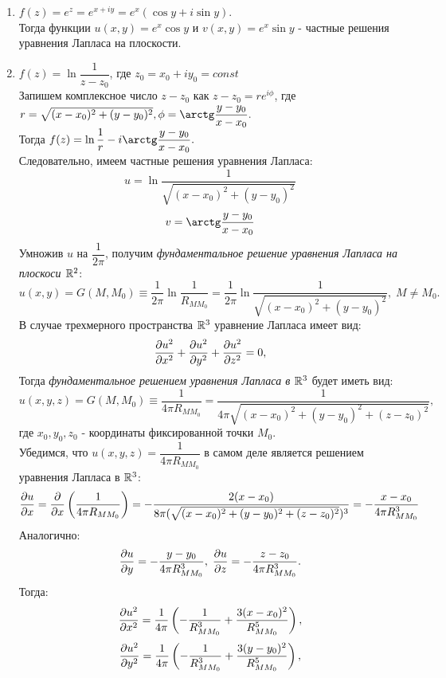 \documentclass[../main.tex]{subfiles}
\begin{document}
    \begin{enumerate}
        \item $f(z) = e^z = e^{x+iy} = e^x(\cos{y}+i\sin{y})$.\\ Тогда функции $u(x,y) = e^x\cos{y}$ и $v(x,y) = e^x\sin{y}$ - частные решения уравнения Лапласа на плоскости.
        \item $f(z) = \ln{\dfrac{1}{z-z_0}}$, где $z_0 = x_0 + iy_0 = const$\\
        Запишем комплексное число $z-z_0$ как $z-z_0=re^{i\phi}$, где $r = \sqrt{(x-x_0)^2 + (y - y_0)^2},\\\phi = \arctg\dfrac{y-y_0}{x-x_0}.$\\
        Тогда $f(z) = \ln{\dfrac{1}{r}} - i\arctg\dfrac{y-y_0}{x-x_0}.$\\
        Следовательно, имеем частные решения уравнения Лапласа:
        \[
            u = \ln{\dfrac{1}{\sqrt{(x-x_0)^2 + (y - y_0)^2}}}
        \]
        \[
            v = \arctg\dfrac{y-y_0}{x-x_0}
        \]
        Умножив $u$ на $\dfrac{1}{2\pi}$, получим \textit{фундаментальное решение уравнения Лапласа на плоскоси $\mathbb{R}^2$}:
        \[
            u(x, y) = G(M, M_0) \equiv \dfrac{1}{2\pi}\ln{\dfrac{1}{R_{MM_0}}} =  \dfrac{1}{2\pi}\ln{\dfrac{1}{\sqrt{(x-x_0)^2 + (y - y_0)^2}}},\; M \ne M_0.
        \]
        В случае трехмерного пространства $\mathbb{R}^3$ уравнение Лапласа имеет вид:
        \[
            \pderivTwo{u}{x}{x} + \pderivTwo{u}{y}{y} + \pderivTwo{u}{z}{z} = 0,
        \]
        Тогда \textit{фундаментальное решением уравнения Лапласа в $\mathbb{R}^3$} будет иметь вид:
        \[
            u(x, y, z) = G(M, M_0) \equiv \dfrac{1}{4\pi R_{MM_0}} =  \dfrac{1}{4\pi{\sqrt{(x-x_0)^2 + (y - y_0)^2 + (z - z_0)^2}}},
        \]
        где $x_0, y_0, z_0$ - координаты фиксированной точки $M_0$.\\
        Убедимся, что $u(x, y, z) = \dfrac{1}{4\pi R_{MM_0}}$ в самом деле является решением уравнения Лапласа в $\mathbb{R}^3$:
        \[
            \frac{\partial u}{\partial x} = \frac{\partial}{\partial x}\left(\dfrac{1}{4\pi R_{MM_0}}\right) =  - \dfrac{2(x-x_0)}{{8\pi(\sqrt{(x-x_0)^2 + (y - y_0)^2 + (z - z_0)^2}})^3} = - \dfrac{x-x_0}{4\pi R_{MM_0}^3}
        \]
        Аналогично:
        \[
            \frac{\partial u}{\partial y} = - \dfrac{y-y_0}{4\pi R_{MM_0}^3},\;
            \frac{\partial u}{\partial z} = - \dfrac{z-z_0}{4\pi R_{MM_0}^3}.
        \]
        Тогда:
        \[
            \pderivTwo{u}{x}{x} = \dfrac{1}{4\pi} \left(-\dfrac{1}{R_{MM_0}^3} + \dfrac{3(x-x_0)^2}{R_{MM_0}^5}\right),
        \]
        \[
            \pderivTwo{u}{y}{y} = \dfrac{1}{4\pi} \left(-\dfrac{1}{R_{MM_0}^3} + \dfrac{3(y-y_0)^2}{R_{MM_0}^5}\right),
\]
\end{enumerate}
\end{document}
